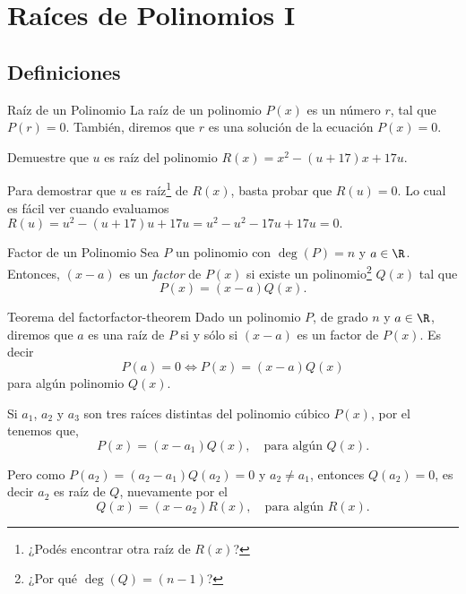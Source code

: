\newpage
\section{Raíces de Polinomios I}

\subsection{Definiciones}

\begin{section-definition.tcb}{Raíz de un Polinomio}{}
    La raíz de un polinomio $P(x)$ es un número $r$, tal que $P(r) = 0$.
    También, diremos que $r$ es una solución de la ecuación $P(x) = 0$.
\end{section-definition.tcb}


\begin{section-example.tcb}
    Demuestre que $u$ es raíz del polinomio $R(x) = x^2 - (u + 17) x + 17u$.
\end{section-example.tcb}
\begin{solution}
    Para demostrar que $u$ es raíz\footnote{¿Podés encontrar otra raíz de $R(x)$?} de $R(x)$, basta probar que $R(u) = 0$.
    Lo cual es fácil ver cuando evaluamos $R(u) = u^2 - (u+17)u + 17u = u^2 - u^2 - 17u + 17u = 0.$
\end{solution}


\begin{section-definition.tcb}{Factor de un Polinomio}{}
    Sea $P$ un polinomio con $\deg{(P)} = n$ y $a \in \R$.
    Entonces, $(x - a)$ es un \emph{factor} de $P(x)$ si existe un polinomio\footnote{¿Por qué $\deg{(Q)} = (n - 1)$?} $Q(x)$ tal que
    \[
        P(x) = (x-a)Q(x).
    \]
\end{section-definition.tcb}

\begin{section-theorem.tcb}{Teorema del factor}{factor-theorem}
    Dado un polinomio $P$, de grado $n$ y $a \in \R$, diremos que $a$ es una raíz de $P$ si y sólo si $(x-a)$ es un factor de $P(x)$.
    Es decir
    \[
        P(a) = 0 \Leftrightarrow P(x) = (x - a)Q(x)
    \]
    para algún polinomio $Q(x).$
\end{section-theorem.tcb}

Si $a_1$, $a_2$ y $a_3$ son tres raíces distintas del polinomio cúbico $P(x)$, por el  tenemos que,
\[
    P(x) = (x - a_1)Q(x),\quad \text{para algún $Q(x)$}.
\]

Pero como $P(a_2) = (a_2 - a_1)Q(a_2) = 0$ y $a_2 \neq a_1$, entonces $Q(a_2) = 0$, es decir $a_2$ es raíz de $Q$, nuevamente por el 
\[
    Q(x) = (x - a_2)R(x),\quad \text{para algún $R(x)$}.
\]

